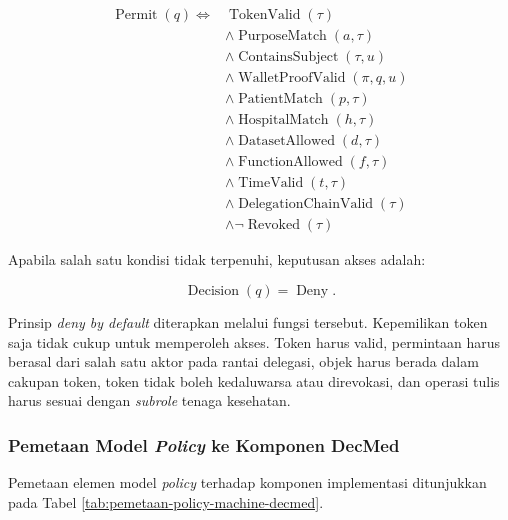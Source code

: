 \documentclass[bahasa, 12pt, a4paper, onecolumn, oneside, final]{report}
\begin{document}
\begin{equation}
	\begin{split}
		\operatorname{Permit}(q)
		\iff {} &
		\operatorname{TokenValid}(\tau)                           \\
		        & \land \operatorname{PurposeMatch}(a,\tau)       \\
		        & \land \operatorname{ContainsSubject}(\tau,u)    \\
		        & \land \operatorname{WalletProofValid}(\pi,q,u)  \\
		        & \land \operatorname{PatientMatch}(p,\tau)       \\
		        & \land \operatorname{HospitalMatch}(h,\tau)      \\
		        & \land \operatorname{DatasetAllowed}(d,\tau)     \\
		        & \land \operatorname{FunctionAllowed}(f,\tau)    \\
		        & \land \operatorname{TimeValid}(t,\tau)          \\
		        & \land \operatorname{DelegationChainValid}(\tau) \\
		        & \land \neg\operatorname{Revoked}(\tau)
	\end{split}
	\label{eq:permit-akses}
\end{equation}

Apabila salah satu kondisi tidak terpenuhi, keputusan akses adalah:

\begin{equation}
	\operatorname{Decision}(q)=\operatorname{Deny}.
	\label{eq:deny-akses}
\end{equation}

Prinsip \textit{deny by default} diterapkan melalui fungsi tersebut. Kepemilikan token saja tidak cukup untuk memperoleh akses. Token harus valid, permintaan harus berasal dari salah satu aktor pada rantai delegasi, objek harus berada dalam cakupan token, token tidak boleh kedaluwarsa atau direvokasi, dan operasi tulis harus sesuai dengan \textit{subrole} tenaga kesehatan.

\subsubsection{Pemetaan Model \textit{Policy} ke Komponen DecMed}

Pemetaan elemen model \textit{policy} terhadap komponen implementasi ditunjukkan pada Tabel \ref{tab:pemetaan-policy-machine-decmed}.
\end{document}
